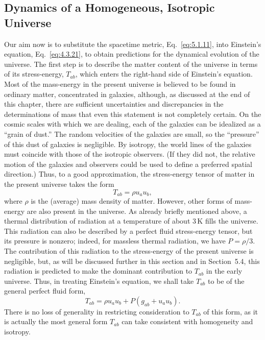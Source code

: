 
\subsection{Dynamics of a Homogeneous, Isotropic Universe}\label{sec:5.2}

Our aim now is to substitute the spacetime metric, Eq.~\eqref{eq:5.1.11}, into
Einstein's equation, Eq.~\eqref{eq:4.3.21}, to obtain predictions for the dynamical
evolution of the universe. The first step is to describe the matter content of the
universe in terms of its stress-energy, \(T_{ab}\), which enters the right-hand side
of Einstein's equation. Most of the mass-energy in the present universe is believed to
be found in ordinary matter, concentrated in galaxies, although, as discussed at the
end of this chapter, there are sufficient uncertainties and discrepancies in the
determinations of mass that even this statement is not completely certain. On the
cosmic scales with which we are dealing, each of the galaxies can be idealized as a
``grain of dust.'' The random velocities of the galaxies are small, so the ``pressure''
of this dust of galaxies is negligible. By isotropy, the world lines of the galaxies
must coincide with those of the isotropic observers. (If they did not, the relative
motion of the galaxies and observers could be used to define a preferred spatial
direction.) Thus, to a good approximation, the stress-energy tensor of matter in the
present universe takes the form
\begin{equation}
  T_{ab}=\rho u_a u_b,
  \tag{5.2.1}\label{eq:5.2.1}
\end{equation}
where \(\rho\) is the (average) mass density of matter. However, other forms of
mass-energy are also present in the universe. As already briefly mentioned above, a
thermal distribution of radiation at a temperature of about \(3\,\mathrm{K}\) fills the
universe. This radiation can also be described by a perfect fluid stress-energy tensor,
but its pressure is nonzero; indeed, for massless thermal radiation, we have
\(P=\rho/3\). The contribution of this radiation to the stress-energy of the present
universe is negligible, but, as will be discussed further in this section and in
Section~5.4, this radiation is predicted to make the dominant contribution to
\(T_{ab}\) in the early universe. Thus, in treating Einstein's equation, we shall take
\(T_{ab}\) to be of the general perfect fluid form,
\begin{equation}
  T_{ab}=\rho u_a u_b+P(g_{ab}+u_a u_b).
  \tag{5.2.2}\label{eq:5.2.2}
\end{equation}
There is no loss of generality in restricting consideration to \(T_{ab}\) of this form,
as it is actually the most general form \(T_{ab}\) can take consistent with
homogeneity and isotropy.

